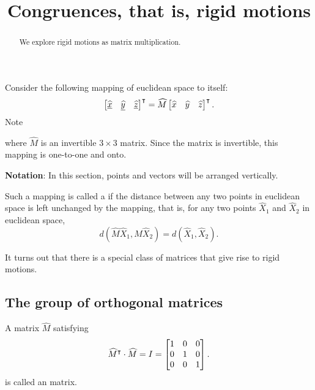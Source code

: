 \documentclass[newpage,hints,handout,12pt,noauthor,nooutcomes]{ximera}
\title{Congruences, that is, rigid motions}
\begin{document}
\begin{abstract}
We explore rigid motions as matrix multiplication.
\end{abstract}
\maketitle



Consider the following mapping of euclidean space to itself:%
\[
\begin{bmatrix}
\underline{\hat{x}} & \underline{\hat{y}} & \underline{\hat{z}}%
\end{bmatrix}^\transpose
=\hat M \begin{bmatrix} \hat{x} & \hat{y} & \hat{z}\end{bmatrix}^\transpose.
\]
Note
\begin{image}
\end{image}

where $\hat{M}$ is an invertible $3\times3$ matrix. Since the matrix
is invertible, this mapping is one-to-one and onto.

\textbf{Notation}: In this section, points and vectors will be arranged
vertically.

\begin{definition}
  Such a mapping is called a  if the distance between any two
  points in euclidean space is left unchanged by the mapping, that is, for
  any two points $\hat{X}_{1}$ and $\hat{X}_{2}$ in euclidean space,%
  \[
  d(\hat{M}\hat{X}_{1},\hat M\hat{X}_{2})=d(\hat{X}_{1},\hat{X}_{2}).
  \]
\end{definition}

It turns out that there is a special class of matrices that give rise
to rigid motions.



\subsection{The group of orthogonal matrices}



\begin{definition}
  A matrix $\hat{M}$ satisfying
  \[
  \widehat{M}^\intercal\cdot\widehat{M}=I=\begin{bmatrix}
  1 & 0 & 0\\
  0 & 1 & 0\\
  0 & 0 & 1
  \end{bmatrix}.
  \]
  is called an  matrix.
\end{definition}
\end{document}
